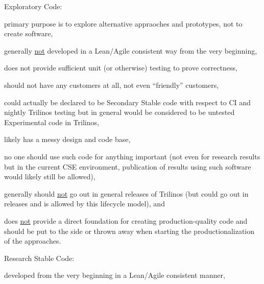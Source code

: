 \documentclass[11pt]{SANDreport}
\begin{document}
\begin{compactenum}

{}\item Exploratory Code:

\begin{compactitem}

{}\item primary purpose is to explore alternative appraoches and
prototypes, not to create software,

{}\item generally {}\underline{not} developed in a Lean/Agile
consistent way from the very beginning,

{}\item does not provide sufficient unit (or otherwise) testing to
prove correctness,

{}\item should not have any customers at all, not even ``friendly''
customers,

{}\item could actually be declared to be Secondary Stable code with
respect to CI and nightly Trilinos testing but in general would be
considered to be untested Experimental code in Trilinos,

{}\item likely has a messy design and code base,

{}\item no one should use such code for anything important (not even
for research results but in the current CSE environment, publication
of results using such software would likely still be allowed),

{}\item generally should {}\underline{not} go out in general releases
of Trilinos (but could go out in releases and is allowed by this
lifecycle model), and

{}\item does {}\underline{not} provide a direct foundation for
creating production-quality code and should be put to the side or
thrown away when starting the productionalization of the approaches.

\end{compactitem}

{}\item Research Stable Code:

\begin{compactitem}

{}\item developed from the very beginning in a Lean/Agile consistent
manner,


\end{compactitem}
\end{compactenum}
\end{document}
